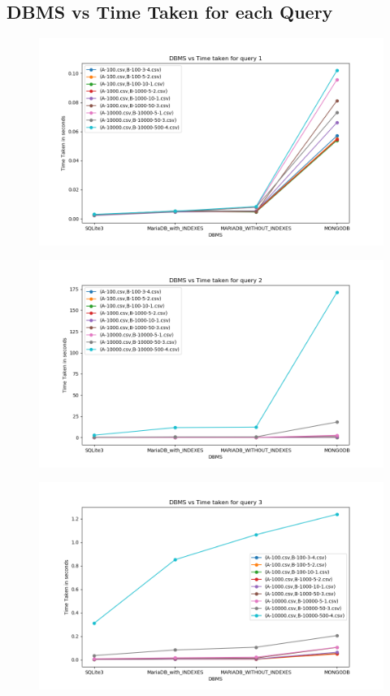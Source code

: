 \documentclass[12pt]{article}
\begin{document}
\subsection{DBMS vs Time Taken for each Query}

\begin{figure}[H]
  \centering
  \includegraphics[width=.95\linewidth]{dbms_time/1.png}
\end{figure}

\begin{figure}[H]
  \centering
  \includegraphics[width=.95\linewidth]{dbms_time/2.png}
\end{figure}

\begin{figure}[H]
  \centering
  \includegraphics[width=.95\linewidth]{dbms_time/3.png}
\end{figure}
\end{document}

